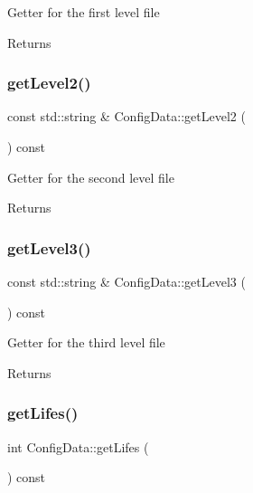 Getter for the first level file \begin{DoxyReturn}{Returns}

\end{DoxyReturn}
\mbox{\label{classConfigData_a073531011ba29efe96cb682801b778e7}} 
\subsubsection{\texorpdfstring{get\+Level2()}{getLevel2()}}
{\footnotesize\ttfamily const std\+::string \& Config\+Data\+::get\+Level2 (\begin{DoxyParamCaption}{ }\end{DoxyParamCaption}) const}

Getter for the second level file \begin{DoxyReturn}{Returns}

\end{DoxyReturn}
\mbox{\label{classConfigData_a995d48538315ad108eed0cbd0eaaae69}} 
\subsubsection{\texorpdfstring{get\+Level3()}{getLevel3()}}
{\footnotesize\ttfamily const std\+::string \& Config\+Data\+::get\+Level3 (\begin{DoxyParamCaption}{ }\end{DoxyParamCaption}) const}

Getter for the third level file \begin{DoxyReturn}{Returns}

\end{DoxyReturn}
\mbox{\label{classConfigData_a90fb727b6f5583b2388a1c0bd853bc1a}} 
\subsubsection{\texorpdfstring{get\+Lifes()}{getLifes()}}
{\footnotesize\ttfamily int Config\+Data\+::get\+Lifes (\begin{DoxyParamCaption}{ }\end{DoxyParamCaption}) const}

